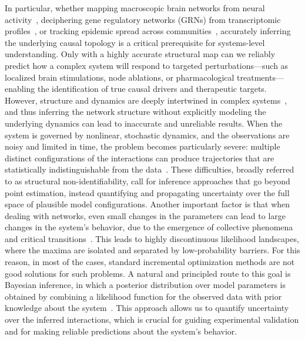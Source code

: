 \documentclass[10pt, aps, rmp,  twocolumn, superscriptaddress, floatfix, showkeys]{revtex4-2}
\begin{document}
In particular, whether mapping macroscopic brain networks from neural activity~\cite{bullmore2009complex}, deciphering gene regulatory networks (GRNs) from transcriptomic profiles~\cite{karlebach2008modelling}, or tracking epidemic spread across communities~\cite{pastor2015epidemic}, accurately inferring the underlying causal topology is a critical prerequisite for systems-level understanding. Only with a highly accurate structural map can we reliably predict how a complex system will respond to targeted perturbations---such as localized brain stimulations, node ablations, or pharmacological treatments---enabling the identification of true causal drivers and therapeutic targets.
However, structure and dynamics are deeply intertwined in complex systems~\cite{gross2008adaptive,barzel2013universality,ghavasieh2024diversity,strogatz2024nonlinear,barzon2024unraveling,sole2001complexity,de2026decoding}, and thus inferring the network structure without explicitly modeling the underlying dynamics can lead to inaccurate and unreliable results. %
When the system is governed by nonlinear, stochastic dynamics, and the observations are noisy and limited in time, the problem becomes particularly severe: multiple distinct configurations of the interactions can produce trajectories that are statistically indistinguishable from the data~\cite{villaverde2014reverse}. These difficulties, broadly referred to as structural non-identifiability, call for inference approaches that go beyond point estimation, instead quantifying and propagating uncertainty over the full space of plausible model configurations.
Another important factor is that when dealing with networks, even small changes in the parameters can lead to large changes in the system's behavior, due to the emergence of collective phenomena and critical transitions~\cite{boccaletti2006complex,dorogovtsev2008critical,pastor2015epidemic, strogatz2024nonlinear}. This leads to highly discontinuous likelihood landscapes, where the maxima are isolated and separated by low-probability barriers. For this reason, in most of the cases, standard incremental optimization methods are not good solutions for such problems.
A natural and principled route to this goal is Bayesian inference, in which a posterior distribution over model parameters is obtained by combining a likelihood function for the observed data with prior knowledge about the system~\cite{peixoto2019network, newman2018network,raimondo2021measuring,peel2022statistical,peixoto2025network}. This approach allows us to quantify uncertainty over the inferred interactions, which is crucial for guiding experimental validation and for making reliable predictions about the system's behavior.
\end{document}
